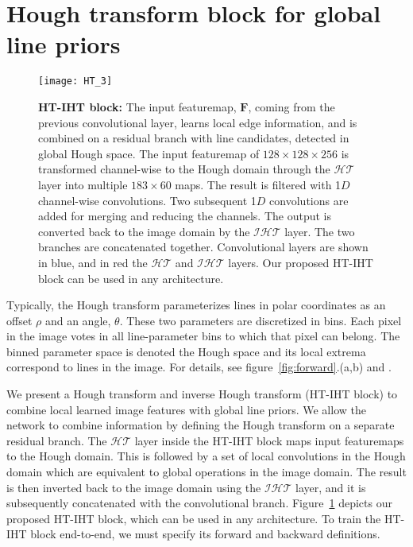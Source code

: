 \documentclass[runningheads]{llncs}
\newcommand{\model}{HT-IHT block\xspace}
\begin{document}
 \section{Hough transform block for global line priors}
\begin{figure}[t!]
    \centering
    \texttt{[image: HT\_3]}
    \caption{\textbf{\model:} The input featuremap, $\mathbf{F}$, coming from the previous convolutional layer, learns local edge information, and is combined on a residual branch with line candidates, detected in global Hough space.
    The input featuremap of $128\times 128 \times 256$ is transformed channel-wise to the Hough domain through the $\mathcal{HT}$ layer into multiple $183\times 60$ maps. 
    The result is filtered with 1$D$ channel-wise convolutions.
    Two subsequent 1$D$ convolutions are added for merging and reducing the channels.  
    The output is converted back to the image domain by the $\mathcal{IHT}$ layer.
    The two branches are concatenated together.
    Convolutional layers are shown in blue, and in red the $\mathcal{HT}$ and $\mathcal{IHT}$ layers.
    Our proposed \model can be used in any architecture.}
    \label{fig:block}
\end{figure}

Typically, the Hough transform parameterizes lines in polar coordinates as an offset $\rho$ and an angle, $\theta$. These two parameters are discretized in bins. Each pixel in the image votes in all line-parameter bins to which that pixel can belong. 
The binned parameter space is denoted the Hough space and its local extrema correspond to lines in the image. For details, see  figure~\ref{fig:forward}.(a,b) and \cite{duda1972use}.     

We present a Hough transform and inverse Hough transform  (\model) to combine local learned image features  with  global line priors.
We allow the network to combine information by defining the 
Hough transform on a separate residual branch. The $\mathcal{HT}$ layer inside the \model maps input featuremaps to the Hough domain.  
This is followed by a set of local convolutions in the Hough domain which are equivalent to global operations in the image domain. 
The result is then inverted back to the image domain using the $\mathcal{IHT}$ layer, and it is subsequently concatenated with the convolutional branch.
Figure~\ref{fig:block} depicts our proposed \model, which can be used in any architecture.  
To train the \model end-to-end, we must specify its forward and backward definitions. 
\end{document}
